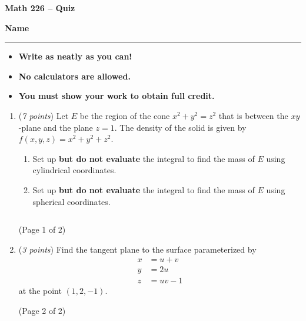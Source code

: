 \documentclass[12 pt]{article}
\begin{document}
  \begin{center}
    \textbf{\hfill Math 226 -- Quiz} \\
  \end{center}
  \medskip

  \noindent
  \textbf{Name}\ \rule{3.5in}{.4pt} \hfill
  \vspace{.1in}
  \hspace*{0.2in}
  \begin{itemize}
    \item \textbf{Write as neatly as you can!}
    \item \textbf{No calculators are allowed.}
    \item \textbf{You must show your work to obtain full credit.}
  \end{itemize}

	\medskip
  \noindent

  \begin{enumerate}
    \item (\textit{7 points})
      Let $E$ be the region of the cone $x^2 + y^2 = z^2$ that is
      between the $xy$-plane and the plane $z = 1$.
      The density of the solid is given by $f(x, y, z) = x^2 + y^2 + z^2$.
      \begin{enumerate}
        \item Set up \textbf{but do not evaluate} the integral to find the mass of $E$ using cylindrical coordinates.
        \item Set up \textbf{but do not evaluate} the integral to find the mass of $E$ using spherical coordinates.
      \end{enumerate}
    $ $
    \vspace*{\fill}\\
    \begin{center}(Page 1 of 2)\end{center}
    \pagebreak
		\item (\textit{3 points}) Find the tangent plane to the surface
    parameterized by \begin{align*}
      x &= u + v \\
      y &= 2u \\
      z &= uv - 1
    \end{align*} at the point $(1,2,-1)$.
    \vspace*{\fill}\\
    \begin{center}(Page 2 of 2)\end{center}
  \end{enumerate}
\end{document}
